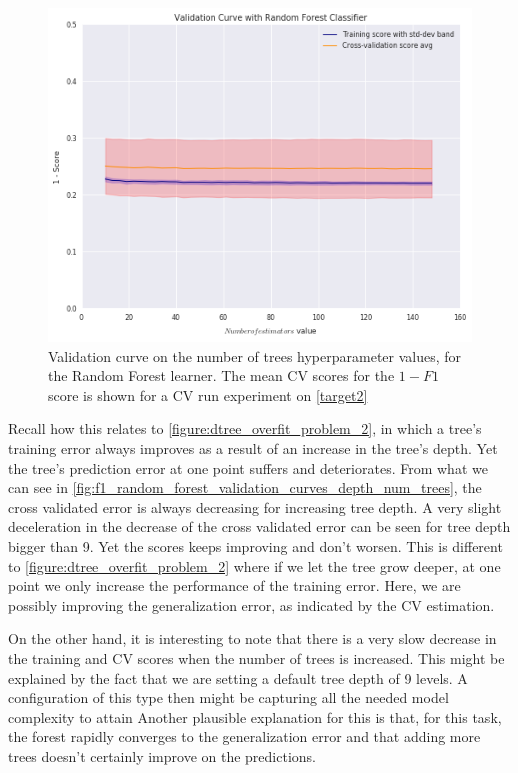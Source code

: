 \begin{figure}[h!]
	\begin{center}
		\includegraphics[width=1\linewidth]{figures/random-forest/validation_curve_forest_num_trees_series_f1}
			\caption{ Validation curve on the number of trees hyperparameter values, for the Random Forest  learner. 
				The mean CV scores for the $1 - F1$ score is shown for a CV run experiment on \cref{target2}}
		\label{f1_random_forest_validation_curves_num_trees}
	\end{center}
\end{figure}

Recall how this relates to \cref{figure:dtree_overfit_problem_2}, in which a tree's training error always improves as a result of an increase in the tree's depth.
Yet the tree's prediction error at one point suffers and deteriorates.
From what we can see in \cref{fig:f1_random_forest_validation_curves_depth_num_trees}, the cross validated error is always decreasing for increasing tree depth.
A very slight deceleration in the decrease of the cross validated error can be seen for tree depth bigger than 9.
Yet the scores keeps improving and don't worsen.
This is different to \cref{figure:dtree_overfit_problem_2} where if we let the tree grow deeper, at one point we only increase the performance of the training error.
Here, we are possibly improving the generalization error, as indicated by the CV estimation.

 On the other hand, it is interesting to note that there is a very slow decrease in the training and CV scores when the number of trees is increased.
 This might be explained by the fact that we are setting a default tree depth of 9 levels.
 A configuration of this type then might be capturing all the needed model complexity to attain
 Another plausible explanation for this is that, for this task, the forest rapidly converges to the generalization error and that adding more trees doesn't certainly improve on the predictions.



